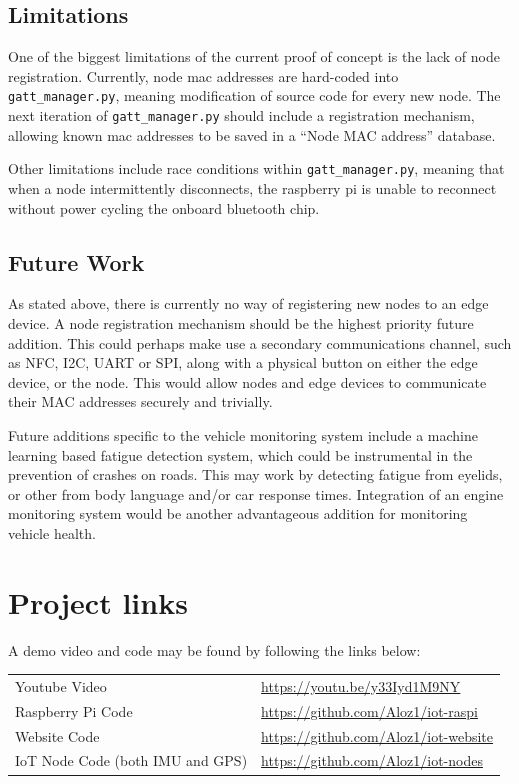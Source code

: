\documentclass[DIV=current]{scrartcl}
\begin{document}
	\subsection{Limitations}
	One of the biggest limitations of the current proof of concept is the lack of node registration. Currently, node mac addresses are hard-coded into \texttt{gatt_manager.py}, meaning modification of source code for every new node. The next iteration of \texttt{gatt_manager.py} should include a registration mechanism, allowing known mac addresses to be saved in a ``Node MAC address'' database.
	
	Other limitations include race conditions within \texttt{gatt_manager.py}, meaning that when a node intermittently disconnects, the raspberry pi is unable to reconnect without power cycling the onboard bluetooth chip.
	
	\subsection{Future Work}
	As stated above, there is currently no way of registering new nodes to an edge device. A node registration mechanism should be the highest priority future addition. This could perhaps make use a secondary communications channel, such as NFC, I2C, UART or SPI, along with a physical button on either the edge device, or the node. This would allow nodes and edge devices to communicate their MAC addresses securely and trivially.
	
	Future additions specific to the vehicle monitoring system include a machine learning based fatigue detection system, which could be instrumental in the prevention of crashes on roads. This may work by detecting fatigue from eyelids, or other from body language and/or car response times. Integration of an engine monitoring system would be another advantageous addition for monitoring vehicle health.
	
	\clearpage
	\printbibliography
	\appendix
	\section{Project links}
	A demo video and code may be found by following the links below:
	\\
	
	\begin{tabular}{ll}
		Youtube Video & \url{https://youtu.be/y33Iyd1M9NY} \\
		Raspberry Pi Code & \url{https://github.com/Aloz1/iot-raspi}   \\
		Website Code & \url{https://github.com/Aloz1/iot-website} \\
		IoT Node Code (both IMU and GPS) & \url{https://github.com/Aloz1/iot-nodes}
	\end{tabular}
	
\end{document}
